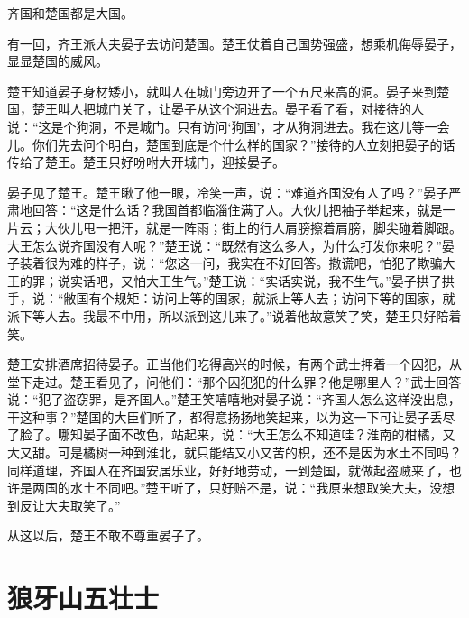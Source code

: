 \documentclass[12pt,UTF-8,openany]{ctexbook}
\begin{document}
\begin{large}
    
    齐国和楚国都是大国。
    
    有一回，齐王派大夫晏子去访问楚国。楚王仗着自己国势强盛，想乘机侮辱晏子，显显楚国的威风。
    
    楚王知道晏子身材矮小，就叫人在城门旁边开了一个五尺来高的洞。晏子来到楚国，楚王叫人把城门关了，让晏子从这个洞进去。晏子看了看，对接待的人说：“这是个狗洞，不是城门。只有访问‘狗国’，才从狗洞进去。我在这儿等一会儿。你们先去问个明白，楚国到底是个什么样的国家？”接待的人立刻把晏子的话传给了楚王。楚王只好吩咐大开城门，迎接晏子。
    
    晏子见了楚王。楚王瞅了他一眼，冷笑一声，说：“难道齐国没有人了吗？”晏子严肃地回答：“这是什么话？我国首都临淄住满了人。大伙儿把袖子举起来，就是一片云；大伙儿甩一把汗，就是一阵雨；街上的行人肩膀擦着肩膀，脚尖碰着脚跟。大王怎么说齐国没有人呢？”楚王说：“既然有这么多人，为什么打发你来呢？”晏子装着很为难的样子，说：“您这一问，我实在不好回答。撒谎吧，怕犯了欺骗大王的罪；说实话吧，又怕大王生气。”楚王说：“实话实说，我不生气。”晏子拱了拱手，说：“敝国有个规矩：访问上等的国家，就派上等人去；访问下等的国家，就派下等人去。我最不中用，所以派到这儿来了。”说着他故意笑了笑，楚王只好陪着笑。
    
    楚王安排酒席招待晏子。正当他们吃得高兴的时候，有两个武士押着一个囚犯，从堂下走过。楚王看见了，问他们：“那个囚犯犯的什么罪？他是哪里人？”武士回答说：“犯了盗窃罪，是齐国人。”楚王笑嘻嘻地对晏子说：“齐国人怎么这样没出息，干这种事？”楚国的大臣们听了，都得意扬扬地笑起来，以为这一下可让晏子丢尽了脸了。哪知晏子面不改色，站起来，说：“大王怎么不知道哇？淮南的柑橘，又大又甜。可是橘树一种到淮北，就只能结又小又苦的枳，还不是因为水土不同吗？同样道理，齐国人在齐国安居乐业，好好地劳动，一到楚国，就做起盗贼来了，也许是两国的水土不同吧。”楚王听了，只好赔不是，说：“我原来想取笑大夫，没想到反让大夫取笑了。”
    
    从这以后，楚王不敢不尊重晏子了。
    
\end{large}



\chapter{狼牙山五壮士}
\end{document}
